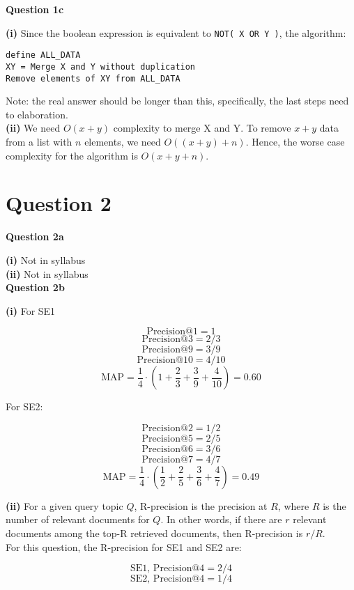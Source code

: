 \documentclass[11pt,a4paper]{report}
\begin{document}
\begin{multicols*}{2}
\noindent \textbf{Question 1c}

\noindent \textbf{(i)} Since the boolean expression is equivalent to \verb|NOT( X OR Y )|, the algorithm:

\begin{lstlisting}
define ALL_DATA
XY = Merge X and Y without duplication
Remove elements of XY from ALL_DATA
\end{lstlisting}

\noindent Note: the real answer should be longer than this, specifically, the last steps need to elaboration. \\

\noindent \textbf{(ii)} We need $O(x+y)$ complexity to merge X and Y. To remove $x+y$ data from a list with $n$ elements, we need $O((x+y)+n)$. Hence, the worse case complexity for the algorithm is $O(x+y+n)$.

\section{Question 2}

\noindent \textbf{Question 2a}

\noindent \textbf{(i)} Not in syllabus\\

\noindent \textbf{(ii)} Not in syllabus\\

\noindent \textbf{Question 2b}

\noindent \textbf{(i)} For SE1

$$\text{Precision@1}=1$$
$$\text{Precision@3}=2/3$$
$$\text{Precision@9}=3/9$$
$$\text{Precision@10}=4/10$$
$$\text{MAP} = \frac{1}{4} \cdot (1 + \frac{2}{3} + \frac{3}{9} + \frac{4}{10})= 0.60$$

\noindent For SE2:

$$\text{Precision@2}=1/2$$
$$\text{Precision@5}=2/5$$
$$\text{Precision@6}=3/6$$
$$\text{Precision@7}=4/7$$
$$\text{MAP} = \frac{1}{4} \cdot (\frac{1}{2} + \frac{2}{5} + \frac{3}{6} + \frac{4}{7}) = 0.49$$

\noindent \textbf{(ii)} For a given query topic $Q$, R-precision is the precision at $R$, where $R$ is the number of relevant documents for $Q$. In other words, if there are $r$ relevant documents among the top-R retrieved documents, then R-precision is $r/R$.\\

\noindent For this question, the R-precision for SE1 and SE2 are:

$$\text{SE1, Precision@4}=2/4$$
$$\text{SE2, Precision@4}=1/4$$


\end{multicols*}
\end{document}

